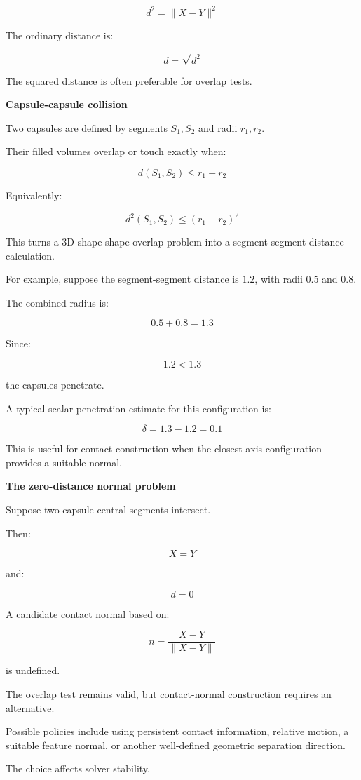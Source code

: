 \[
\boxed{d^2=\|X-Y\|^2}
\]

The ordinary distance is:

\[
\boxed{d=\sqrt{d^2}}
\]

The squared distance is often preferable for overlap tests.

\textbf{Capsule-capsule collision}

Two capsules are defined by segments \(S_1,S_2\) and radii \(r_1,r_2\).

Their filled volumes overlap or touch exactly when:

\[
\boxed{ d(S_1,S_2)\le r_1+r_2 }
\]

Equivalently:

\[
\boxed{ d^2(S_1,S_2)\le(r_1+r_2)^2 }
\]

This turns a 3D shape-shape overlap problem into a segment-segment distance calculation.

For example, suppose the segment-segment distance is \(1.2\), with radii \(0.5\) and \(0.8\).

The combined radius is:

\[
0.5+0.8=1.3
\]

Since:

\[
1.2<1.3
\]

the capsules penetrate.

A typical scalar penetration estimate for this configuration is:

\[
\boxed{ \delta=1.3-1.2=0.1 }
\]

This is useful for contact construction when the closest-axis configuration provides a suitable normal.

\textbf{The zero-distance normal problem}

Suppose two capsule central segments intersect.

Then:

\[
X=Y
\]

and:

\[
d=0
\]

A candidate contact normal based on:

\[
n=\frac{X-Y}{\|X-Y\|}
\]

is undefined.

The overlap test remains valid, but contact-normal construction requires an alternative.

Possible policies include using persistent contact information, relative motion, a suitable feature normal, or another well-defined geometric separation direction.

The choice affects solver stability.

